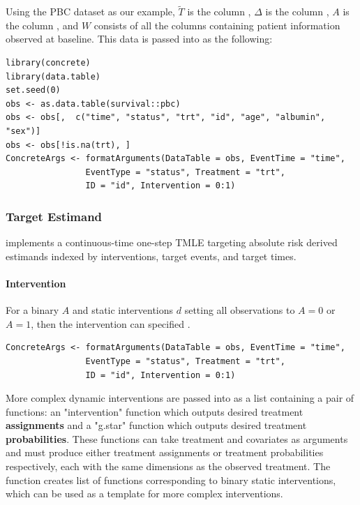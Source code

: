 \documentclass{report}
\newcommand{\1}{\ensuremath{\mathbf{1}}}
\newcommand{\T}{\ensuremath{\widetilde{T}}}
\renewcommand{\L}{\ensuremath{W}}
\begin{document}
Using the PBC dataset as our example, \(\T\) is the column , \(\Delta\) is the column , \(A\) is the column , and \(\L\) consists of all the columns containing patient information observed at baseline.  This data is passed into  as the following:
\begin{lstlisting}
library(concrete)
library(data.table)
set.seed(0)
obs <- as.data.table(survival::pbc)
obs <- obs[,  c("time", "status", "trt", "id", "age", "albumin", "sex")]
obs <- obs[!is.na(trt), ]
ConcreteArgs <- formatArguments(DataTable = obs, EventTime = "time",
				EventType = "status", Treatment = "trt",
				ID = "id", Intervention = 0:1)
\end{lstlisting}

\subsubsection{Target Estimand}
\label{Estimand}
 implements a continuous-time one-step TMLE targeting absolute risk derived estimands indexed by  interventions, target events, and target times.  

\paragraph{Intervention}
\label{TreatmentRegime}
For a binary \(A\) and static interventions \(d\) setting all observations to \(A=0\) or \(A=1\), then the intervention can specified .
\begin{lstlisting}
ConcreteArgs <- formatArguments(DataTable = obs, EventTime = "time",
				EventType = "status", Treatment = "trt",
				ID = "id", Intervention = 0:1)
\end{lstlisting}

More complex dynamic interventions are passed into  as a list containing a pair of functions: an "intervention" function which outputs desired treatment \textbf{\textbf{assignments}} and a "g.star" function which outputs desired treatment \textbf{\textbf{probabilities}}. These functions can take treatment and covariates as arguments and must produce either treatment assignments or treatment probabilities respectively, each with the same dimensions as the observed treatment. The function  creates list of functions corresponding to binary static interventions, which can be used as a template for more complex interventions.
\end{document}
